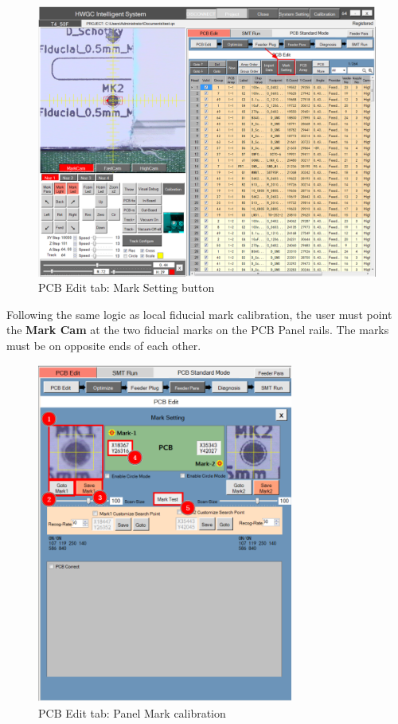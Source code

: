 \documentclass[a4paper,10pt]{report}
\begin{document}
\begin{figure}[!htb]
 \centering
 \includegraphics[width=1\textwidth]{scrot16.png}
 \caption{PCB Edit tab: Mark Setting button}
\end{figure}
\newpage
Following the same logic as local fiducial mark calibration, the user must point the \textbf{Mark Cam} at the two fiducial marks on the PCB Panel rails. The marks must be on opposite ends of each other.
\begin{figure}[!htb]
 \centering
 \includegraphics[width=0.75\textwidth]{scrot17.png}
 \caption{PCB Edit tab: Panel Mark calibration}
\end{figure}
\end{document}
